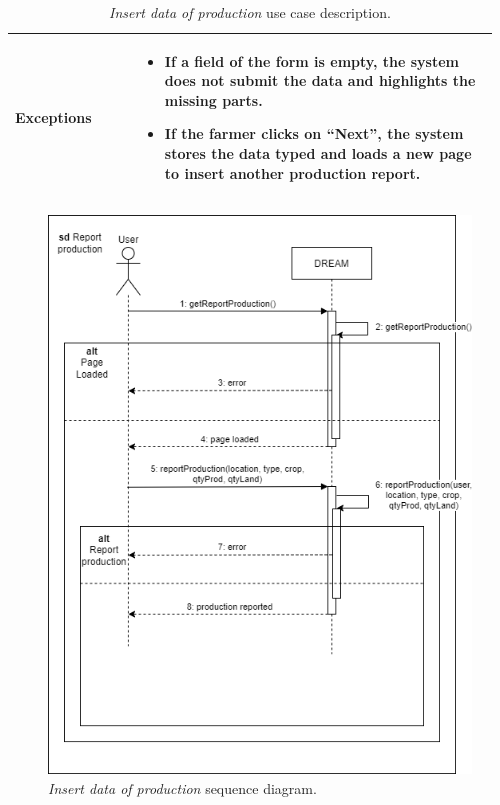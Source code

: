 \begin{table}[H]
\begin{tabular}{@{}p{0.25\linewidth}p{0.71\linewidth}@{}}
        \hline
        \textbf{Exceptions} &
        \begin{itemize}[leftmargin=.4cm,noitemsep,topsep=0pt,before=\vspace{-3mm},after=\vspace{-4mm}]
            \item If a field of the form is empty, the system does not submit the data and highlights the missing parts.
            \item If the farmer clicks on “Next”, the system stores the data typed and loads a new page to insert another production report.
        \end{itemize} \\
        \hline
    \end{tabular}
    \caption{\textit{Insert data of production} use case description.}
\end{table}
\begin{figure}[H]
    \centering
    \includegraphics[width=\linewidth]{Images/Use Case/UC11.png}
    \caption{\textit{Insert data of production} sequence diagram.}
\end{figure}
\newpage

